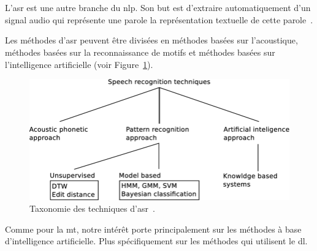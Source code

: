 \section{}

L'\gls{asr} est une autre branche du \gls{nlp}.
Son but est d'extraire automatiquement d'un signal audio qui représente une parole
la représentation textuelle de cette parole~\cite{Huang_Hayashi_Wu_Kameoka_Toda_2021}.

Les méthodes d'\gls{asr} peuvent être divisées en méthodes basées sur l'acoustique,
méthodes basées sur la reconnaissance de motifs
et méthodes basées sur l'intelligence artificielle (voir Figure~\ref{fig.asr-taxonomy-tree}).

\begin{figure}
    \centering
    \includegraphics[width=\textwidth]{assets/images/Taxonomy-of-techniques-used-in-ASR.png}
    \caption[Taxonomie des techniques d'\gls{asr}.]
    {Taxonomie des techniques d'\gls{asr}~\cite{Volny_Novak_Zezula_2012}.}
    \label{fig.asr-taxonomy-tree}
\end{figure}

Comme pour la \gls{mt},
notre intérêt porte principalement sur les méthodes à base d'intelligence artificielle.
Plus spécifiquement sur les méthodes qui utilisent le \gls{dl}.